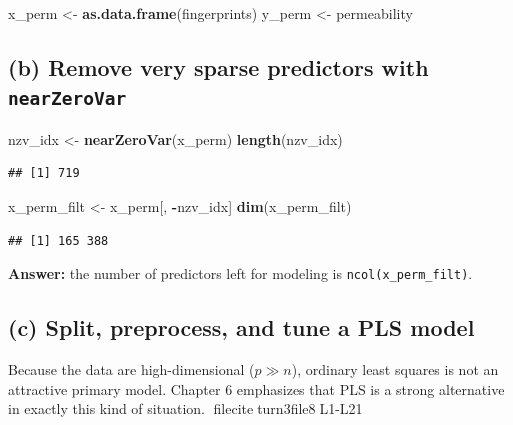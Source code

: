 \documentclass[
  11pt,
]{article}
\newenvironment{Shaded}{\begin{snugshade}}{\end{snugshade}}
\newcommand{\FunctionTok}[1]{\textcolor[rgb]{0.13,0.29,0.53}{\textbf{#1}}}
\newcommand{\NormalTok}[1]{#1}
\newcommand{\OtherTok}[1]{\textcolor[rgb]{0.56,0.35,0.01}{#1}}
\newcommand{\SpecialCharTok}[1]{\textcolor[rgb]{0.81,0.36,0.00}{\textbf{#1}}}
\begin{document}
\begin{Shaded}
\begin{Highlighting}[]
\NormalTok{x\_perm }\OtherTok{\textless{}{-}} \FunctionTok{as.data.frame}\NormalTok{(fingerprints)}
\NormalTok{y\_perm }\OtherTok{\textless{}{-}}\NormalTok{ permeability}
\end{Highlighting}
\end{Shaded}

\subsection{\texorpdfstring{(b) Remove very sparse predictors with
\texttt{nearZeroVar}}{(b) Remove very sparse predictors with nearZeroVar}}\label{b-remove-very-sparse-predictors-with-nearzerovar}

\begin{Shaded}
\begin{Highlighting}[]
\NormalTok{nzv\_idx }\OtherTok{\textless{}{-}} \FunctionTok{nearZeroVar}\NormalTok{(x\_perm)}
\FunctionTok{length}\NormalTok{(nzv\_idx)}
\end{Highlighting}
\end{Shaded}

\begin{verbatim}
## [1] 719
\end{verbatim}

\begin{Shaded}
\begin{Highlighting}[]
\NormalTok{x\_perm\_filt }\OtherTok{\textless{}{-}}\NormalTok{ x\_perm[, }\SpecialCharTok{{-}}\NormalTok{nzv\_idx]}
\FunctionTok{dim}\NormalTok{(x\_perm\_filt)}
\end{Highlighting}
\end{Shaded}

\begin{verbatim}
## [1] 165 388
\end{verbatim}

\textbf{Answer:} the number of predictors left for modeling is
\texttt{ncol(x\_perm\_filt)}.

\subsection{(c) Split, preprocess, and tune a PLS
model}\label{c-split-preprocess-and-tune-a-pls-model}

Because the data are high-dimensional (\(p \gg n\)), ordinary least
squares is not an attractive primary model. Chapter 6 emphasizes that
PLS is a strong alternative in exactly this kind of situation.
fileciteturn3file8L1-L21
\end{document}
